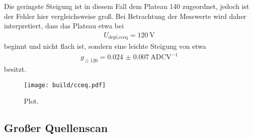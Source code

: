 Die geringste Steigung ist in diesem Fall dem Plateau 140 zugeordnet, jedoch ist der Fehler hier vergleichsweise groß.
Bei Betrachtung der Messwerte wird daher interpretiert, dass das Plateau etwa bei
\begin{align}
  U_\text{depl,cceq} = \SI{120}{\volt}
\end{align}
beginnt und nicht flach ist, sondern eine leichte Steigung von etwa
\begin{align}
  g_{\geq120} =  \SI{0.024(7)}{\text{ADC}\volt\tothe{-1}}
\end{align}
besitzt.

\begin{figure}
  \centering
  \texttt{[image: build/cceq.pdf]}
  \caption{Plot.}
  \label{fig:cceq}
\end{figure}

\subsection{Großer Quellenscan}






